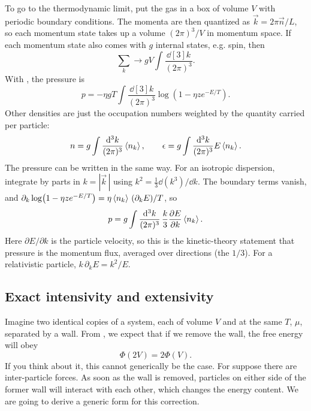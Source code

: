 To go to the thermodynamic limit, put the gas in a box of volume $V$ with
periodic boundary conditions. The momenta are then quantized as
$\vec{k}=2\pi\vec{n}/L$, so each momentum state takes up a volume $(2\pi)^3/V$ in
momentum space. If each momentum state also comes with $g$ internal states,
e.g. spin, then
\begin{equation}\label{eq:modesum}
  \sum_k\to gV\int\frac{\dd[3]{k}}{(2\pi)^3}.
\end{equation}
With , the pressure is
\begin{equation}\label{eq:pressmode}
  p=-\eta gT\int\frac{\dd[3]{k}}{(2\pi)^3}\log\left(1-\eta ze^{-E/T}\right).
\end{equation}
Other densities are just the occupation numbers weighted by the quantity
carried per particle:
\begin{equation}\label{eq:densitiesmode}
  n=g\int\frac{\dd[3]{k}}{(2\pi)^3}\expval{n_k},\qquad
  \epsilon=g\int\frac{\dd[3]{k}}{(2\pi)^3}E\expval{n_k}.
\end{equation}
The pressure can be written in the same way. For an isotropic dispersion,
integrate  by parts in $k=|\vec{k}\,|$ using
$k^2=\frac{1}{3}\dd(k^3)/\dd{k}$. The boundary terms vanish, and
$\partial_k\log(1-\eta ze^{-E/T})=\eta\expval{n_k}\,(\partial_kE)/T$, so
\begin{equation}\label{eq:presskinetic}
  p=g\int\frac{\dd[3]{k}}{(2\pi)^3}\,\frac{k}{3}\pdv{E}{k}\expval{n_k}.
\end{equation}
Here $\partial E/\partial k$ is the particle velocity, so this is the kinetic-theory
statement that pressure is the momentum flux, averaged over directions (the
$1/3$). For a relativistic particle, $k\,\partial_kE=k^2/E$.

\subsection{Exact intensivity and extensivity}\label{sec:exactIntens}

Imagine two identical copies of a system, each of volume $V$ and at the same
$T$, $\mu$, separated by a wall. From , we expect
that if we remove the wall, the free energy will obey
\begin{equation}
\Phi(2V)=2\Phi(V).
\end{equation}
If you think about it, this cannot generically be the case. For suppose there
are inter-particle forces. As soon as the wall is removed, particles on either
side of the former wall will interact with each other, which changes the energy
content. We are going to derive a generic form for this correction.

